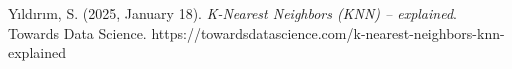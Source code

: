 \documentclass[conference]{IEEEtran}
\begin{document}
\begin{thebibliography}{00}
        Yıldırım, S. (2025, January 18). \textit{K-Nearest Neighbors (KNN) – explained}.
        Towards Data Science.
        https://towardsdatascience.com/k-nearest-neighbors-knn-explained\
    \end{thebibliography}
\end{document}
